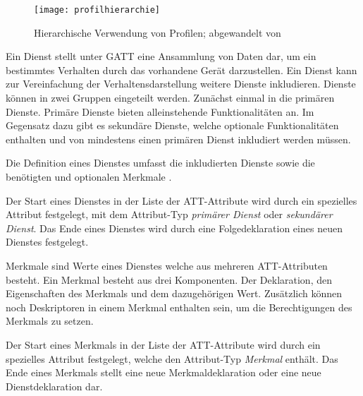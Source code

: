\begin{figure}[h]
    \centering
    \texttt{[image: profilhierarchie]}
    \caption{Hierarchische Verwendung von Profilen; abgewandelt von \cite[S.~1468]{bluetoothCore}}
    \label{fig:profilhierarchie}
\end{figure}

Ein Dienst stellt unter \ac{GATT} eine Ansammlung von Daten dar, um ein bestimmtes Verhalten durch das vorhandene Gerät darzustellen. Ein Dienst kann zur Vereinfachung der Verhaltensdarstellung weitere Dienste inkludieren. Dienste können in zwei Gruppen eingeteilt werden. Zunächst einmal in die primären Dienste. Primäre Dienste bieten alleinstehende Funktionalitäten an. Im Gegensatz dazu gibt es sekundäre Dienste, welche optionale Funktionalitäten enthalten und von mindestens einen primären Dienst inkludiert werden müssen. \cite[S.~281]{bluetoothCore}

Die Definition eines Dienstes umfasst die inkludierten Dienste sowie die benötigten und optionalen Merkmale \cite[S.~1481]{bluetoothCore}.

Der Start eines Dienstes in der Liste der \ac{ATT}-Attribute wird durch ein spezielles Attribut festgelegt, mit dem Attribut-Typ \textit{primärer Dienst} oder \textit{sekundärer Dienst}. Das Ende eines Dienstes wird durch eine Folgedeklaration eines neuen Dienstes festgelegt. \cite[S.~1483]{bluetoothCore}

Merkmale sind Werte eines Dienstes welche aus mehreren \ac{ATT}-Attributen besteht. Ein Merkmal besteht aus drei Komponenten. Der Deklaration, den Eigenschaften des Merkmals und dem dazugehörigen Wert. Zusätzlich können noch Deskriptoren in einem Merkmal enthalten sein, um die Berechtigungen des Merkmals zu setzen. \cite[S.~281]{bluetoothCore}

Der Start eines Merkmals in der Liste der \ac{ATT}-Attribute wird durch ein spezielles Attribut festgelegt, welche den Attribut-Typ \textit{Merkmal} enthält. Das Ende eines Merkmals stellt eine neue Merkmaldeklaration oder eine neue Dienstdeklaration dar. \cite[S.~1484ff.]{bluetoothCore}

